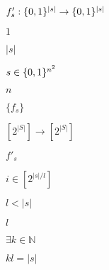 \documentclass[10pt]{book}
\begin{document}
\begin{mdSnippets}
\begin{mdInlineSnippet}%
$f'_s:\{0,1\}^{|s|}\rightarrow\{0,1\}^{|s|}$\end{mdInlineSnippet}%
\begin{mdInlineSnippet}[c4ca4238a0b923820dcc509a6f75849b]%
$1$\end{mdInlineSnippet}%
\begin{mdInlineSnippet}%
$|s|$\end{mdInlineSnippet}%
\begin{mdInlineSnippet}%
$s \in \{0,1\}^{n^2}$\end{mdInlineSnippet}%
\begin{mdInlineSnippet}[7b8b965ad4bca0e41ab51de7b31363a1]%
$n$\end{mdInlineSnippet}%
\begin{mdInlineSnippet}[43213da206d5ba5b73b6f689164b3ada]%
$\{f_s \}$\end{mdInlineSnippet}%
\begin{mdInlineSnippet}[d3346ace0c5af62a7de98012d75077e1]%
$[2^{|S|}] \to [2^{|S|}]$\end{mdInlineSnippet}%
\begin{mdInlineSnippet}%
$f'_s$\end{mdInlineSnippet}%
\begin{mdInlineSnippet}%
$i \in [2^{|s|/l}]$\end{mdInlineSnippet}%
\begin{mdInlineSnippet}[2622c575cbe2e2153fa473e25a0278b5]%
$l < |s|$\end{mdInlineSnippet}%
\begin{mdInlineSnippet}[2db95e8e1a9267b7a1188556b2013b33]%
$l$\end{mdInlineSnippet}%
\begin{mdInlineSnippet}[24113a23216377402ea721cf190d51dc]%
$\exists k \in \mathbb{N}$\end{mdInlineSnippet}%
\begin{mdInlineSnippet}[cbd7e0ac7d786b3e347cf34480fc542c]%
$kl = |s|$\end{mdInlineSnippet}%
\begin{mdInlineSnippet}[e358efa489f58062f10dd7316b65649e]%

\end{mdInlineSnippet}
\end{mdSnippets}
\end{document}
